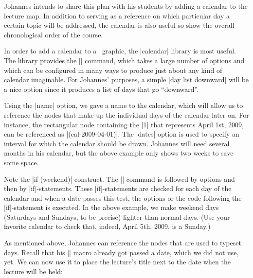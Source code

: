 Johannes intends to share this plan with his students by adding a
calendar to the lecture map. In addition to serving as a reference
on which particular day a certain  topic will be addressed, the
calendar is also useful so show the overall chronological order of the
course.

In order to add a calendar to a \tikzname\ graphic, the |calendar|
library is most useful. The library provides the |\calendar| command,
which takes a large number of options and which can be configured in
many ways to produce just about any kind of calendar imaginable. For
Johannes' purposes, a simple |day list downward| will be a nice option
since it produces a list of days that go ``downward''.

\begin{codeexample}
\tiny
{}
\end{codeexample}

Using the |name| option, we gave a name to the calendar, which will
allow us to reference the nodes that make up the individual days of
the calendar later on. For instance, the rectangular node containing the
|1| that represents April 1st, 2009, can be referenced as
|(cal-2009-04-01)|. The |dates| option is used to specify an
interval for which the calendar should be drawn. Johannes will need
several months in his calendar, but the above example only shows two
weeks to save some space.

Note the |if (weekend)| construct. The |\calendar| command is followed
by options and then by |if|-statements. These |if|-statements are
checked for each day of the calendar and when a date passes this test,
the options or the code following the |if|-statement is executed. In
the above example, we make weekend days (Saturdays and Sundays, to be
precise) lighter than normal days. (Use your favorite calendar to
check that, indeed, April 5th, 2009, is a Sunday.)

As mentioned above, Johannes can reference the nodes that are used to
typeset days. Recall that his |\lecture| macro already got passed a
date, which we did not use, yet. We can now use it to place the
lecture's title next to the date when the lecture will be held:


\begin{codeexample}
\def\lecture#1#2#3#4#5#6{
  \node [annotation, #3, scale=0.65, text width=4cm, inner sep=2mm] at (#4) {
    Lecture #1: \textcolor{orange}{\textbf{#2}}
    \list{--}{\topsep=2pt\itemsep=0pt\parsep=0pt
              \parskip=0pt\labelwidth=8pt\leftmargin=8pt
              \itemindent=0pt\labelsep=2pt}
    #5
    \endlist
  };
  \node [anchor=base west] at (cal-#6.base east) {\textcolor{orange}{\textbf{#2}}};
}
\end{codeexample}
\def\lecture#1#2#3#4#5#6{
  \node [anchor=base west] at (cal-#6.base east) {\textcolor{orange}{\textbf{#2}}};
}

